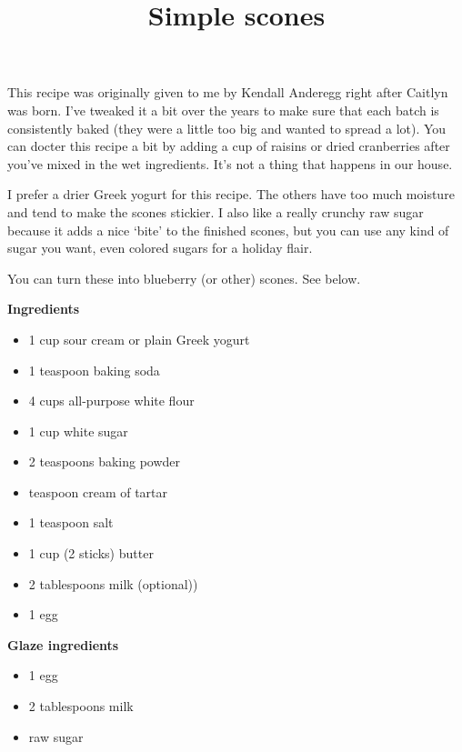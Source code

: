 \documentclass{article}
\title{Simple scones}
\begin{document}
This recipe was originally given to me by Kendall Anderegg right after Caitlyn was
born. I've tweaked it a bit over the years to make sure that each batch is consistently
baked (they were a little too big and wanted to spread a lot). You can docter this
recipe a bit by adding a cup of raisins or dried cranberries after you've mixed in
the wet ingredients. It's not a thing that happens in our house.

I prefer a drier Greek yogurt for this recipe. The others have too much moisture and
tend to make the scones stickier. I also like a really crunchy raw sugar because it
adds a nice `bite' to the finished scones, but you can use any kind of sugar you want,
even colored sugars for a holiday flair.

You can turn these into blueberry (or other) scones. See below.

\bigskip

\begin{multicols}{2}
      \textbf{Ingredients}

      \begin{itemize}
            \item 1 cup sour cream or plain Greek yogurt
            \item 1 teaspoon baking soda
            \item 4 cups all-purpose white flour
            \item 1 cup white sugar
            \item 2 teaspoons baking powder
            \item {} teaspoon cream of tartar
            \item 1 teaspoon salt
            \item 1 cup (2 sticks) butter
            \item 2 tablespoons milk (optional))
            \item 1 egg
      \end{itemize}

      \columnbreak

      \textbf{Glaze ingredients}
      \begin{itemize}
            \item 1 egg
            \item 2 tablespoons milk
            \item raw sugar
      \end{itemize}

\end{multicols}
\end{document}
